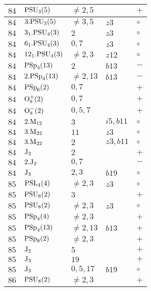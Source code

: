 \documentclass[a4paper, 11pt]{article}
\begin{document}
\begin{longtable}{lllll}
		$84$ & ${\rm PSU}_{3}(5)$ & $\neq 2,5$ &  & $+$ \\ \hline
		$84$ & $3.{\rm PSU}_{3}(5)$ & $\neq 3,5$ & $z3$ & $\circ$ \\ \hline
		$84$ & $3_1.{\rm PSU}_{4}(3)$ & $2$ & $z3$ & $\circ$ \\ \hline
		$84$ & $6_1.{\rm PSU}_{4}(3)$ & $0,7$ & $z3$ & $\circ$ \\ \hline
		$84$ & $12_1.{\rm PSU}_{4}(3)$ & $\neq 2,3$ & $z12$ & $\circ$ \\ \hline
		$84$ & ${\rm PSp}_{4}(13)$ & $2$ & $b13$ & $-$ \\ \hline
		$84$ & $2.{\rm PSp}_{4}(13)$ & $\neq 2,13$ & $b13$ & $-$ \\ \hline
		$84$ & ${\rm PSp}_{6}(2)$ & $0,7$ &  & $+$ \\ \hline
		$84$ & ${\rm O}_{8}^+(2)$ & $0,7$ &  & $+$ \\ \hline
		$84$ & ${\rm O}_{8}^-(2)$ & $0,5,7$ &  & $+$ \\ \hline
		$84$ & $2.{\rm M}_{12}$ & $3$ & $i5, b11$ & $\circ$ \\ \hline
		$84$ & $3.{\rm M}_{22}$ & $11$ & $z3$ & $\circ$ \\ \hline
		$84$ & $3.{\rm M}_{22}$ & $2$ & $z3, b11$ & $\circ$ \\ \hline
		$84$ & ${\rm J}_2$ & $2$ &  & $+$ \\ \hline
		$84$ & $2.{\rm J}_2$ & $0,7$ &  & $-$ \\ \hline
		$84$ & ${\rm J}_3$ & $2,3$ & $b19$ & $\circ$ \\ \hline
		$85$ & ${\rm PSL}_{4}(4)$ & $\neq 2,3$ & $z3$ & $\circ$ \\ \hline
		$85$ & ${\rm PSU}_{8}(2)$ & $3$ &  & $+$ \\ \hline
		$85$ & ${\rm PSU}_{8}(2)$ & $\neq 2,3$ & $z3$ & $\circ$ \\ \hline
		$85$ & ${\rm PSp}_{4}(4)$ & $\neq 2,3$ &  & $+$ \\ \hline
		$85$ & ${\rm PSp}_{4}(13)$ & $\neq 2,13$ & $b13$ & $+$ \\ \hline
		$85$ & ${\rm PSp}_{8}(2)$ & $\neq 2,3$ &  & $+$ \\ \hline
		$85$ & ${\rm J}_2$ & $5$ &  & $+$ \\ \hline
		$85$ & ${\rm J}_3$ & $19$ &  & $+$ \\ \hline
		$85$ & ${\rm J}_3$ & $0,5,17$ & $b19$ & $\circ$ \\ \hline
		$86$ & ${\rm PSU}_{8}(2)$ & $\neq 2,3$ &  & $+$ \\ \hline

\end{longtable}
\end{document}
